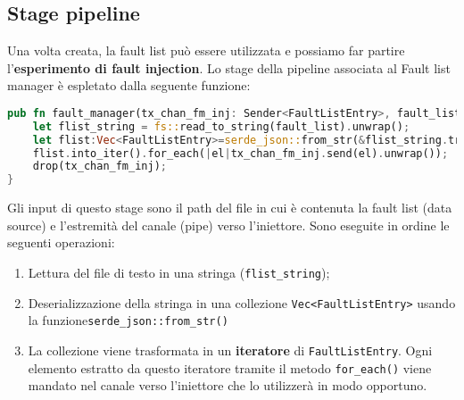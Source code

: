 \subsection{Stage pipeline}
Una volta creata, la fault list può essere utilizzata e possiamo far partire l'\textbf{esperimento di fault injection}. Lo stage della pipeline associata al \textsf{Fault list manager} è espletato dalla seguente funzione: 

\begin{lstlisting}[language=rust, style=boxed]
pub fn fault_manager(tx_chan_fm_inj: Sender<FaultListEntry>, fault_list:String){
    let flist_string = fs::read_to_string(fault_list).unwrap();
    let flist:Vec<FaultListEntry>=serde_json::from_str(&flist_string.trim()).unwrap();
    flist.into_iter().for_each(|el|tx_chan_fm_inj.send(el).unwrap());
    drop(tx_chan_fm_inj);
}
\end{lstlisting}
Gli input di questo stage sono il path del file in cui è contenuta la fault list (data source) e l'estremità del canale (pipe) verso l'iniettore. Sono eseguite in ordine le seguenti operazioni: 
\begin{enumerate}
    \itemsep-0.3em
    \item Lettura del file di testo in una stringa (\texttt{flist\_string});  
    \item Deserializzazione della stringa in una collezione \texttt{Vec<FaultListEntry>} usando la funzione\newline \texttt{serde\_json::from\_str()}
    \item La collezione viene trasformata in un \textbf{iteratore} di \texttt{FaultListEntry}. Ogni elemento estratto da questo iteratore tramite il metodo \texttt{for\_each()} viene mandato nel canale verso l'iniettore che lo utilizzerà in modo opportuno.
\end{enumerate}